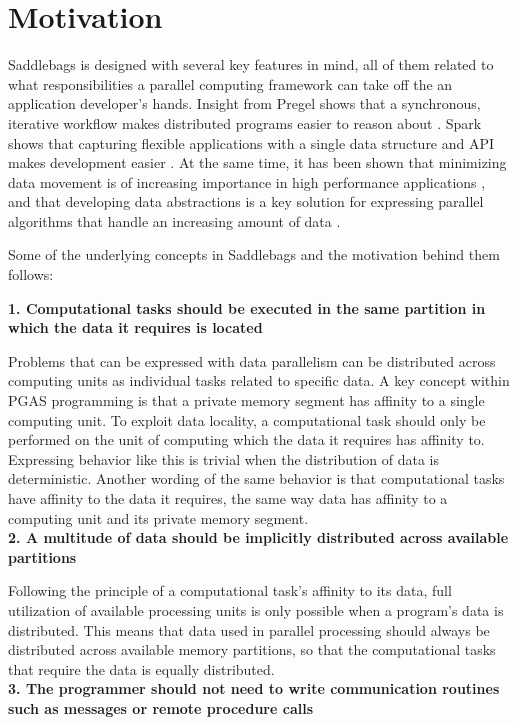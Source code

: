 \documentclass{uit-report}
\begin{document}
\section{Motivation}
Saddlebags is designed with several key features in mind, all of them related to what responsibilities a parallel computing framework can take off the an application developer's hands. Insight from Pregel shows that a synchronous, iterative workflow makes distributed programs easier to reason about \cite{pregel}. Spark shows that capturing flexible applications with a single data structure and API makes development easier \cite{sparkarticle}. At the same time, it has been shown that minimizing data movement is of increasing importance in high performance applications \cite{abstractionslocality}, and that developing data  abstractions is a key solution for expressing parallel algorithms that handle an increasing amount of data \cite{hall2013rethinking}.

Some of the underlying concepts in Saddlebags and the motivation behind them follows:

\hspace{4ex} \textbf{1. Computational tasks should be executed in the same partition in which the data it requires is located}

Problems that can be expressed with data parallelism can be distributed across computing units as individual tasks related to specific data. A key concept within PGAS programming is that a private memory segment has affinity to a single computing unit. To exploit data locality, a computational task should only be performed on the unit of computing which the data it requires has affinity to. Expressing behavior like this is trivial when the distribution of data is deterministic. Another wording of the same behavior is that computational tasks have affinity to the data it requires, the same way data has affinity to a computing unit and its private memory segment.
\\

\hspace{4ex} \textbf{2. A multitude of data should be implicitly distributed across available partitions}

Following the principle of a computational task's affinity to its data, full utilization of available processing units is only possible when a program's data is distributed. This means that data used in parallel processing should always be distributed across available memory partitions, so that the computational tasks that require the data is equally distributed.
\\	
\newpage
\hspace{4ex} \textbf{3. The programmer should not need to write communication routines such as messages or remote procedure calls}
\end{document}
